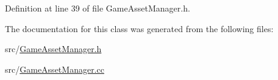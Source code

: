 Definition at line 39 of file Game\+Asset\+Manager.\+h.



The documentation for this class was generated from the following files\+:\begin{DoxyCompactItemize}
\item 
src/\hyperlink{_game_asset_manager_8h}{Game\+Asset\+Manager.\+h}\item 
src/\hyperlink{_game_asset_manager_8cc}{Game\+Asset\+Manager.\+cc}\end{DoxyCompactItemize}
